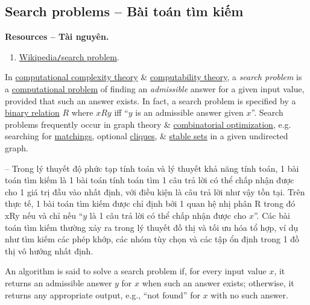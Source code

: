 \documentclass[oneside]{book}
\begin{document}
\subsection{Search problems -- Bài toán tìm kiếm}
\textbf{\textsf{Resources -- Tài nguyên.}}
\begin{enumerate}
	\item \href{https://en.wikipedia.org/wiki/Search_problem}{Wikipedia{\tt/}search problem}.
\end{enumerate}
In \href{https://en.wikipedia.org/wiki/Computational_complexity_theory}{computational complexity theory} \& \href{https://en.wikipedia.org/wiki/Computability_theory}{computability theory}, a {\it search problem} is a \href{https://en.wikipedia.org/wiki/Computational_problem}{computational problem} of finding an {\it admissible} answer for a given input value, provided that such an answer exists. In fact, a search problem is specified by a \href{https://en.wikipedia.org/wiki/Binary_relation}{binary relation} $R$ where $xRy$ iff ``$y$ is an admissible answer given $x$''. Search problems frequently occur in graph theory \& \href{https://en.wikipedia.org/wiki/Combinatorial_optimization}{combinatorial optimization}, e.g. searching for \href{https://en.wikipedia.org/wiki/Matching_(graph_theory)}{matchings}, optional \href{https://en.wikipedia.org/wiki/Clique_(graph_theory)}{cliques}, \& \href{https://en.wikipedia.org/wiki/Independent_set_(graph_theory)}{stable sets} in a given undirected graph.

-- Trong lý thuyết độ phức tạp tính toán và lý thuyết khả năng tính toán, 1 bài toán tìm kiếm là 1 bài toán tính toán tìm 1 câu trả lời có thể chấp nhận được cho 1 giá trị đầu vào nhất định, với điều kiện là câu trả lời như vậy tồn tại. Trên thực tế, 1 bài toán tìm kiếm được chỉ định bởi 1 quan hệ nhị phân R trong đó xRy nếu và chỉ nếu ``$y$ là 1 câu trả lời có thể chấp nhận được cho $x$''. Các bài toán tìm kiếm thường xảy ra trong lý thuyết đồ thị và tối ưu hóa tổ hợp, ví dụ như tìm kiếm các phép khớp, các nhóm tùy chọn và các tập ổn định trong 1 đồ thị vô hướng nhất định.

An algorithm is said to solve a search problem if, for every input value $x$, it returns an admissible answer $y$ for $x$ when such an answer exists; otherwise, it returns any appropriate output, e.g., ``not found'' for $x$ with no such answer.
\end{document}
